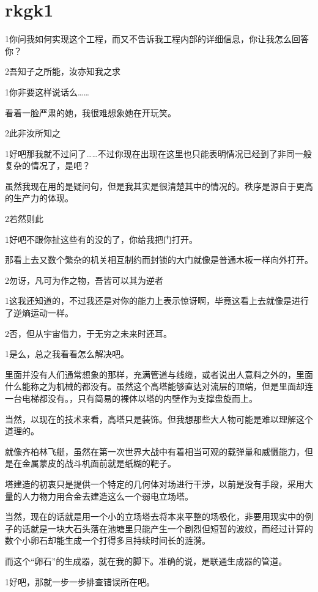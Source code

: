\documentclass{article}
\begin{document}
\section{rkgk1} %
\label{rkgk}

1你问我如何实现这个工程，而又不告诉我工程内部的详细信息，你让我怎么回答你？

2吾知子之所能，汝亦知我之求

1你非要这样说话么……

看着一脸严肃的她，我很难想象她在开玩笑。

2此非汝所知之

1好吧那我就不过问了……不过你现在出现在这里也只能表明情况已经到了非同一般复杂的情况了，是吧？

虽然我现在用的是疑问句，但是我其实是很清楚其中的情况的。秩序是源自于更高的生产力的体现。

2若然则此

1好吧不跟你扯这些有的没的了，你给我把门打开。

那看上去又数个繁杂的机关相互制约而封锁的大门就像是普通木板一样向外打开。

2勿讶，凡可为作之物，吾皆可以其为逆者

1这我还知道的，不过我还是对你的能力上表示惊讶啊，毕竟这看上去就像是进行了逆熵运动一样。

2否，但从宇宙借力，于无穷之未来时还耳。

1是么，总之我看看怎么解决吧。

里面并没有人们通常想象的那样，充满管道与线缆，或者说出人意料之外的，里面什么能称之为机械的都没有。虽然这个高塔能够直达对流层的顶端，但是里面却连一台电梯都没有。，只有简易的裸体以塔的内壁作为支撑盘旋而上。

当然，以现在的技术来看，高塔只是装饰。但我想那些大人物可能是难以理解这个道理的。

就像齐柏林飞艇，虽然在第一次世界大战中有着相当可观的载弹量和威慑能力，但是在金属蒙皮的战斗机面前就是纸糊的靶子。

塔建造的初衷只是提供一个特定的几何体对场进行干涉，以前是没有手段，采用大量的人力物力用合金去建造这么一个弱电立场塔。

当然，现在的话就是用一个小的立场塔去将本来平整的场极化，非要用现实中的例子的话就是一块大石头落在池塘里只能产生一个剧烈但短暂的波纹，而经过计算的数个小卵石却能生成一个打得多且持续时间长的涟漪。

而这个“卵石”的生成器，就在我的脚下。准确的说，是联通生成器的管道。

1好吧，那就一步一步排查错误所在吧。
\end{document}
